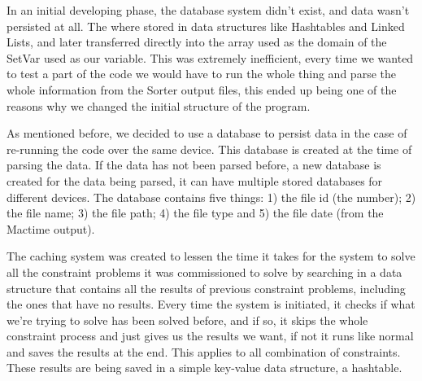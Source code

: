 In an initial developing phase, the database system didn't exist, and data wasn't persisted at all.
The \INODES where stored in data structures like Hashtables and Linked Lists, and later transferred directly into the array used as the domain of the SetVar used as our variable. This was extremely inefficient, every time we wanted to test a part of the code we would have to run the whole thing and parse the whole information from the Sorter output files, this ended up being one of the reasons why we changed the initial structure of the program.

As mentioned before, we decided to use a database to persist data in the case of re-running the code over the same device. This database is created at the time of parsing the data. If the data has not been parsed before, a new database is created for the data being parsed, it can have multiple stored databases for different devices. The database contains five things: 1) the file id (the \INODE number); 2) the file name; 3) the file path; 4) the file type and 5) the file date (from the Mactime output).

The caching system was created to lessen the time it takes for the system to solve all the constraint problems it was commissioned to solve by searching in a data structure that contains all the results of previous constraint problems, including the ones that have no results. Every time the system is initiated, it checks if what we're trying to solve has been solved before, and if so, it skips the whole constraint process and just gives us the results we want, if not it runs like normal and saves the results at the end. This applies to all combination of constraints. These results are being saved in a simple key-value data structure, a hashtable.



